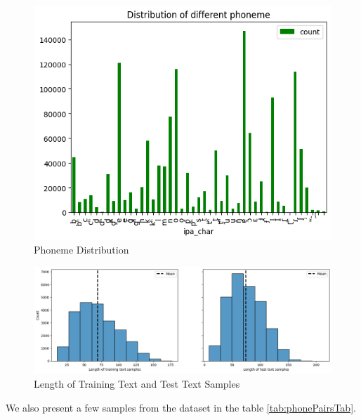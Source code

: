  \begin{figure}[htbp]
    \centering
    \includegraphics[width=\textwidth]{Images/Graph/phoneme_distribution.png}
    \caption{Phoneme Distribution}
    \label{fig:phoneme_distibution}
\end{figure} 
\newpage

 \begin{figure}[htbp]
    \centering
    \includegraphics[width=\textwidth]{Images/Graph/length.png}
    \caption{Length of Training Text and Test Text Samples}
    \label{fig:lenght_distribution}
\end{figure} 



We also present a few samples from the dataset in the table \ref{tab:phonePairsTab}.


